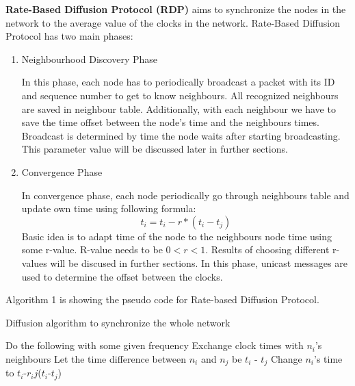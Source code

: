 \documentclass{llncs}
\begin{document}
 \textbf{Rate-Based Diffusion Protocol (RDP)} aims to synchronize the nodes in the network to the average value of the clocks in the network.
Rate-Based Diffusion Protocol has two main phases:
\begin{enumerate}
\item  Neighbourhood Discovery Phase

In this phase, each node has to periodically broadcast a packet with its ID and sequence number to get to know neighbours. All recognized neighbours are saved in neighbour table. Additionally, with each neighbour we have to save the time offset between the node's time and the neighbours times. Broadcast is determined by time the node waits after starting broadcasting. This parameter value will be discussed later in further sections. 

\item  Convergence Phase

In convergence phase, each node periodically go through neighbours table and update own time using following formula:
\[t_i= t_i -  r * (t_i-t_j)\]
Basic idea is to adapt time of the node to the neighbours node time using some r-value.
R-value needs to be $0<r<1$. Results of choosing different r-values will be discused in further sections. 
In this phase, unicast messages are used to determine the offset between the clocks.  
\end{enumerate}
\pagebreak 
Algorithm 1 is showing the pseudo code for Rate-based Diffusion Protocol. 
\begin{algorithm}
 \caption{Diffusion algorithm to synchronize the whole network}\label{euclid}
  \begin{algorithmic}[1]
    \STATE Do the following with some given frequency
     \STATE Exchange clock times with $n_i$'s neighbours
        \STATE Let the time difference between $n_i$ and $n_j$ be $t_i$ - $t_j$
        \STATE Change $n_i$'s time to $t_i$-$r_ij$($t_i$-$t_j$)
      \ENDFOR
    \ENDFOR
\end{algorithmic}
\end{algorithm}

\end{document}
